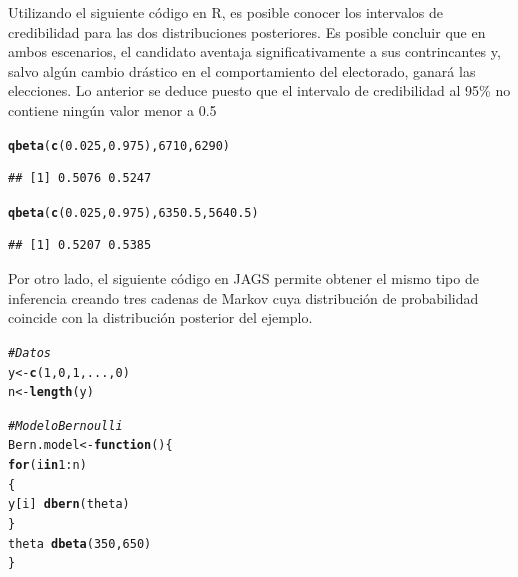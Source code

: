 \documentclass[10pt,openright]{book}\usepackage[]{graphicx}\usepackage[]{color}
\makeatletter
\newcommand{\hlnum}[1]{\textcolor[rgb]{0.686,0.059,0.569}{#1}}%
\newcommand{\hlcom}[1]{\textcolor[rgb]{0.678,0.584,0.686}{\textit{#1}}}%
\newcommand{\hlopt}[1]{\textcolor[rgb]{0,0,0}{#1}}%
\newcommand{\hlstd}[1]{\textcolor[rgb]{0.345,0.345,0.345}{#1}}%
\newcommand{\hlkwa}[1]{\textcolor[rgb]{0.161,0.373,0.58}{\textbf{#1}}}%
\newcommand{\hlkwb}[1]{\textcolor[rgb]{0.69,0.353,0.396}{#1}}%
\newcommand{\hlkwd}[1]{\textcolor[rgb]{0.737,0.353,0.396}{\textbf{#1}}}%
\newenvironment{kframe}{%
 \def\at@end@of@kframe{}%
 \ifinner\ifhmode%
  \def\at@end@of@kframe{\end{minipage}}%
  \begin{minipage}{\columnwidth}%
 \fi\fi%
 \def\FrameCommand##1{\hskip\@totalleftmargin \hskip-\fboxsep
 \colorbox{shadecolor}{##1}\hskip-\fboxsep
     \hskip-\linewidth \hskip-\@totalleftmargin \hskip\columnwidth}%
 \MakeFramed {\advance\hsize-\width
   \@totalleftmargin\z@ \linewidth\hsize
   \@setminipage}}%
 {\par\unskip\endMakeFramed%
 \at@end@of@kframe}
\newenvironment{knitrout}{}{} %
\makeatother
\begin{document}
\begin{Eje}
    Utilizando el siguiente c\'odigo en R, es posible conocer los intervalos de credibilidad para las dos distribuciones posteriores. Es posible concluir que en ambos escenarios, el candidato aventaja significativamente a sus contrincantes y, salvo alg\'un cambio dr\'astico en el comportamiento del electorado, ganar\'a las elecciones. Lo anterior se deduce puesto que el intervalo de credibilidad al 95\% no contiene ning\'un valor menor a 0.5
    
\begin{knitrout}
\color{fgcolor}\begin{kframe}
\begin{alltt}
\hlkwd{qbeta}\hlstd{(}\hlkwd{c}\hlstd{(}\hlnum{0.025}\hlstd{,} \hlnum{0.975}\hlstd{),} \hlnum{6710}\hlstd{,} \hlnum{6290}\hlstd{)}
\end{alltt}
\begin{verbatim}
## [1] 0.5076 0.5247
\end{verbatim}
\begin{alltt}
\hlkwd{qbeta}\hlstd{(}\hlkwd{c}\hlstd{(}\hlnum{0.025}\hlstd{,}\hlnum{0.975}\hlstd{),} \hlnum{6350.5}\hlstd{,} \hlnum{5640.5}\hlstd{)}
\end{alltt}
\begin{verbatim}
## [1] 0.5207 0.5385
\end{verbatim}
\end{kframe}
\end{knitrout}

    Por otro lado, el siguiente c\'odigo en JAGS permite obtener el mismo tipo de inferencia creando tres cadenas de Markov cuya distribuci\'on de probabilidad coincide con la distribuci\'on posterior del ejemplo.
    
\begin{knitrout}
\color{fgcolor}\begin{kframe}
\begin{alltt}
\hlcom{# Datos}
\hlstd{y} \hlkwb{<-} \hlkwd{c}\hlstd{(}\hlnum{1}\hlstd{,} \hlnum{0}\hlstd{,} \hlnum{1}\hlstd{,...,} \hlnum{0}\hlstd{)}
\hlstd{n} \hlkwb{<-}\hlkwd{length}\hlstd{(y)}

\hlcom{# Modelo Bernoulli}
\hlstd{Bern.model} \hlkwb{<-}\hlkwa{function}\hlstd{() \{}
\hlkwa{for}\hlstd{(i} \hlkwa{in} \hlnum{1}\hlopt{:}\hlstd{n)}
\hlstd{\{}
\hlstd{y[i]}\hlopt{~}\hlkwd{dbern}\hlstd{(theta)}
\hlstd{\}}
\hlstd{theta}\hlopt{~}\hlkwd{dbeta}\hlstd{(}\hlnum{350}\hlstd{,} \hlnum{650}\hlstd{)}
\hlstd{\}}


\end{alltt}
\end{kframe}
\end{knitrout}
\end{Eje}
\end{document}
